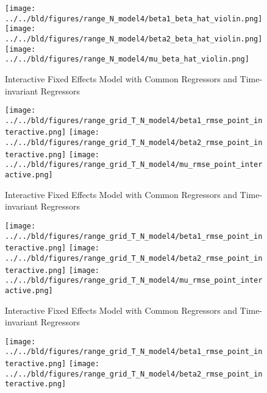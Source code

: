 \documentclass[a4paper]{article}
\begin{document}
\clearpage
\begin{figure}[h]
\centering
\texttt{[image: ../../bld/figures/range\_N\_model4/beta1\_beta\_hat\_violin.png]}
\centering
\texttt{[image: ../../bld/figures/range\_N\_model4/beta2\_beta\_hat\_violin.png]}
\centering
\texttt{[image: ../../bld/figures/range\_N\_model4/mu\_beta\_hat\_violin.png]}
\centering
\caption{\centering Interactive Fixed Effects Model with Common Regressors and Time-invariant Regressors}
\label{figure:figure11}
\end{figure}

\clearpage
\begin{figure}[ht]
\centering
\texttt{[image: ../../bld/figures/range\_grid\_T\_N\_model4/beta1\_rmse\_point\_interactive.png]}
\centering
\texttt{[image: ../../bld/figures/range\_grid\_T\_N\_model4/beta2\_rmse\_point\_interactive.png]}
\centering
\texttt{[image: ../../bld/figures/range\_grid\_T\_N\_model4/mu\_rmse\_point\_interactive.png]}
\centering
\caption{\centering Interactive Fixed Effects Model with Common Regressors and Time-invariant Regressors}
\label{figure:figure12}
\end{figure}


\clearpage
\begin{figure}[ht]
\centering
\texttt{[image: ../../bld/figures/range\_grid\_T\_N\_model4/beta1\_rmse\_point\_interactive.png]}
\centering
\texttt{[image: ../../bld/figures/range\_grid\_T\_N\_model4/beta2\_rmse\_point\_interactive.png]}
\centering
\texttt{[image: ../../bld/figures/range\_grid\_T\_N\_model4/mu\_rmse\_point\_interactive.png]}
\centering
\caption{\centering Interactive Fixed Effects Model with Common Regressors and Time-invariant Regressors}
\label{figure:figure13}
\end{figure}


\newpage

\begin{figure}[]

\centering
\texttt{[image: ../../bld/figures/range\_grid\_T\_N\_model4/beta1\_rmse\_point\_interactive.png]}
\centering
\texttt{[image: ../../bld/figures/range\_grid\_T\_N\_model4/beta2\_rmse\_point\_interactive.png]}
\centering
\caption{}
\label{figure:figure14}
\end{figure}
\end{document}
